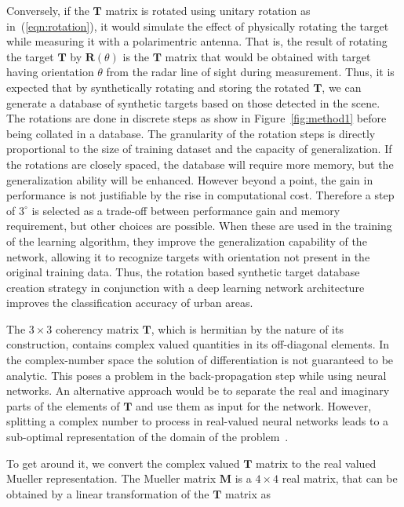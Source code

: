Conversely, if the $\mathbf{T}$ matrix is rotated using unitary rotation as in~(\ref{eqn:rotation}), it would simulate the effect of physically rotating the target while measuring it with a polarimentric antenna. That is, the result of rotating the target $\mathbf{T}$ by $\mathbf{R}(\theta)$ is the $\mathbf{T}$ matrix that would be obtained with target having orientation $\theta$ from the radar line of sight during measurement. Thus, it is expected that by synthetically rotating and storing the rotated $\mathbf{T}$, we can generate a database of synthetic targets based on those detected in the scene.  The rotations are done in discrete steps as show in Figure~\ref{fig:method1} before being collated in a database. The granularity of the rotation steps is directly proportional to the size of training dataset and the capacity of generalization. If the rotations are closely spaced, the database will require more memory, but the generalization ability will be enhanced. However beyond a point, the gain in performance is not justifiable by the rise in computational cost. Therefore a step of $3^\circ$ is selected as a trade-off between performance gain and memory requirement, but other choices are possible. When these are used in the training of the learning algorithm, they improve the generalization capability of the network, allowing it to recognize targets with orientation not present in the original training data. Thus, the rotation based synthetic target database creation strategy in conjunction with a deep learning network architecture improves the classification accuracy of urban areas.

The $3\times3$ coherency matrix $\mathbf{T}$, which is hermitian by the nature of its construction, contains complex valued quantities in its off-diagonal elements. In the complex-number space the solution of differentiation is not guaranteed to be analytic. This poses a problem in the back-propagation step while using neural networks. An alternative approach would be to separate the real and imaginary parts of the elements of  $\mathbf{T}$ and use them as input for the network. However, splitting a complex number to process in real-valued neural networks leads to a sub-optimal representation of the domain of the problem~\cite{hirose2006complex}.

To get around it, we convert the complex valued $\mathbf{T}$ matrix to the real valued Mueller representation. 
The Mueller matrix $\mathbf{M}$ is a $4\times4$ real matrix, that can be obtained by a linear transformation of the $\mathbf{T}$ matrix as


